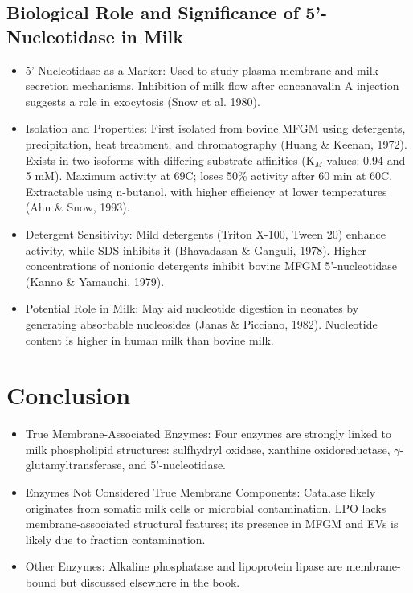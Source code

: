 \subsection*{Biological Role and Significance of 5'-Nucleotidase in Milk}
\begin{itemize}
    \item 5’-Nucleotidase as a Marker:
    \subitem Used to study plasma membrane and milk secretion mechanisms.
    \subitem Inhibition of milk flow after concanavalin A injection suggests a role in exocytosis (Snow et al. 1980).

    \item Isolation and Properties:
    \subitem First isolated from bovine MFGM using detergents, precipitation, heat treatment, and chromatography (Huang \& Keenan, 1972).
    \subitem Exists in two isoforms with differing substrate affinities (K$_M$ values: 0.94 and 5 mM).
    \subitem Maximum activity at 69\textdegree C; loses 50\% activity after 60 min at 60\textdegree C.
    \subitem Extractable using n-butanol, with higher efficiency at lower temperatures (Ahn \& Snow, 1993).

    \item Detergent Sensitivity:
    \subitem Mild detergents (Triton X-100, Tween 20) enhance activity, while SDS inhibits it (Bhavadasan \& Ganguli, 1978).
    \subitem Higher concentrations of nonionic detergents inhibit bovine MFGM 5’-nucleotidase (Kanno \& Yamauchi, 1979).

    \item Potential Role in Milk:
    \subitem May aid nucleotide digestion in neonates by generating absorbable nucleosides (Janas \& Picciano, 1982).
    \subitem Nucleotide content is higher in human milk than bovine milk.
\end{itemize}

\section{Conclusion}
\begin{itemize}
    \item True Membrane-Associated Enzymes:
    \subitem Four enzymes are strongly linked to milk phospholipid structures: sulfhydryl oxidase, xanthine oxidoreductase, $\gamma$-glutamyltransferase, and 5’-nucleotidase.

    \item Enzymes Not Considered True Membrane Components:
    \subitem Catalase likely originates from somatic milk cells or microbial contamination.
    \subitem LPO lacks membrane-associated structural features; its presence in MFGM and EVs is likely due to fraction contamination.

    \item Other Enzymes:
    \subitem Alkaline phosphatase and lipoprotein lipase are membrane-bound but discussed elsewhere in the book.
\end{itemize}


